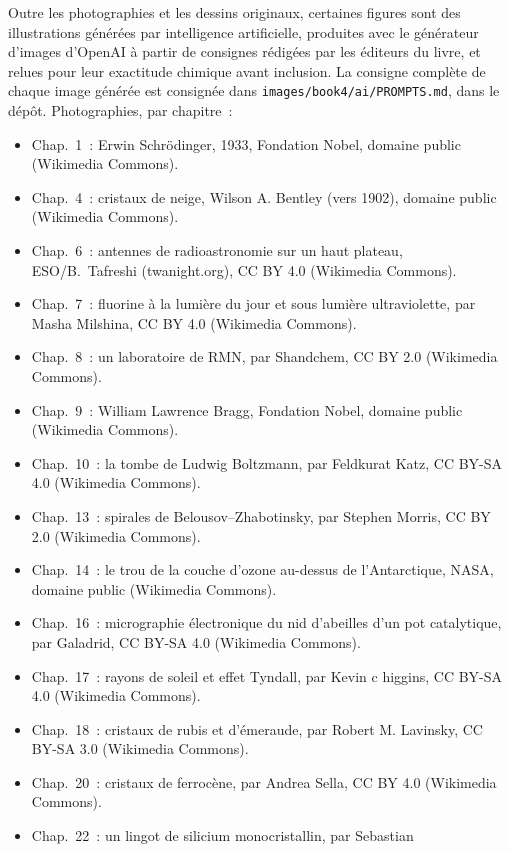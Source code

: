 \bigskip
Outre les photographies et les dessins originaux, certaines figures sont
des illustrations générées par intelligence artificielle, produites avec
le générateur d'images d'OpenAI à partir de consignes rédigées par les
éditeurs du livre, et relues pour leur exactitude chimique avant
inclusion. La consigne complète de chaque image générée est consignée
dans \texttt{images/book4/ai/PROMPTS.md}, dans le dépôt.
\bigskip
\noindent Photographies, par chapitre~:
\begin{itemize}\small
  \item Chap.~1~: Erwin Schrödinger, 1933, Fondation Nobel, domaine public
        (Wikimedia Commons).
  \item Chap.~4~: cristaux de neige, Wilson A. Bentley (vers 1902), domaine
        public (Wikimedia Commons).
  \item Chap.~6~: antennes de radioastronomie sur un haut plateau,
        ESO/B.~Tafreshi (twanight.org), CC BY 4.0 (Wikimedia Commons).
  \item Chap.~7~: fluorine à la lumière du jour et sous lumière
        ultraviolette, par Masha Milshina, CC BY 4.0 (Wikimedia Commons).
  \item Chap.~8~: un laboratoire de RMN, par Shandchem, CC BY 2.0
        (Wikimedia Commons).
  \item Chap.~9~: William Lawrence Bragg, Fondation Nobel, domaine public
        (Wikimedia Commons).
  \item Chap.~10~: la tombe de Ludwig Boltzmann, par Feldkurat Katz,
        CC BY-SA 4.0 (Wikimedia Commons).
  \item Chap.~13~: spirales de Belousov--Zhabotinsky, par Stephen Morris,
        CC BY 2.0 (Wikimedia Commons).
  \item Chap.~14~: le trou de la couche d'ozone au-dessus de
        l'Antarctique, NASA, domaine public (Wikimedia Commons).
  \item Chap.~16~: micrographie électronique du nid d'abeilles d'un pot
        catalytique, par Galadrid, CC BY-SA 4.0 (Wikimedia Commons).
  \item Chap.~17~: rayons de soleil et effet Tyndall, par Kevin c higgins,
        CC BY-SA 4.0 (Wikimedia Commons).
  \item Chap.~18~: cristaux de rubis et d'émeraude, par Robert M. Lavinsky,
        CC BY-SA 3.0 (Wikimedia Commons).
  \item Chap.~20~: cristaux de ferrocène, par Andrea Sella, CC BY 4.0
        (Wikimedia Commons).
  \item Chap.~22~: un lingot de silicium monocristallin, par Sebastian

\end{itemize}
